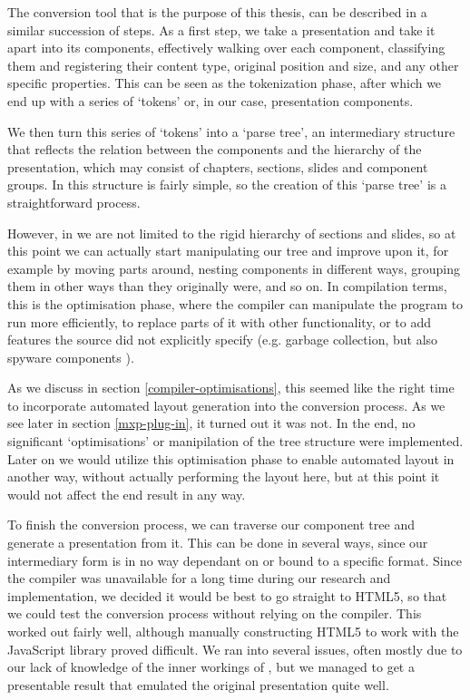    The conversion tool that is the purpose of this thesis, can be described in
   a similar succession of steps. As a first step, we take a \ppt presentation
   and take it apart into its components, effectively walking over each
   component, classifying them and registering their content type, original
   position and size, and any other specific properties. This can be seen as
   the tokenization phase, after which we end up with a series of `tokens' or,
   in our case, presentation components.
  
   We then turn this series of `tokens' into a `parse tree', an intermediary
   structure that reflects the relation between the components and the
   hierarchy of the presentation, which may consist of chapters, sections,
   slides and component groups. In \ppt this structure is fairly simple, so the
   creation of this `parse tree' is a straightforward process.
  
   However, in \mxp we are not limited to the rigid hierarchy of sections and
   slides, so at this point we can actually start manipulating our tree and
   improve upon it, for example by moving parts around, nesting components in
   different ways, grouping them in other ways than they originally were, and so on.
   In compilation terms, this is the optimisation phase, where the compiler can
   manipulate the program to run more efficiently, to replace parts of it with
   other functionality, or to add features the source did not explicitly specify
   (e.g. garbage collection, but also spyware components \citep{scahill-1}). 

   As we discuss in section \ref{compiler-optimisations}, this seemed like the
   right time to incorporate automated layout generation into the conversion
   process. As we see later in section \ref{mxp-plug-in}, it turned out it
   was not. In the end, no significant `optimisations' or manipilation of the
   tree structure were implemented. Later on we would utilize this optimisation
   phase to enable automated layout in another way, without actually performing
   the layout here, but at this point it would not affect the end result in any
   way.
  
   To finish the conversion process, we can traverse our component tree and
   generate a \mxp presentation from it. This can be done in several ways,
   since our intermediary form is in no way dependant on or bound to a specific
   format. Since the \mxp compiler was unavailable for a long time during our
   research and implementation, we decided it would be best to go straight to
   HTML5, so that we could test the conversion process without relying on the
   \mxp compiler. This worked out fairly well, although manually constructing
   HTML5 to work with the \mxp JavaScript library proved difficult. We ran into
   several issues, often mostly due to our lack of knowledge of the inner
   workings of \mxp, but we managed to get a presentable result that emulated
   the original \ppt presentation quite well.

